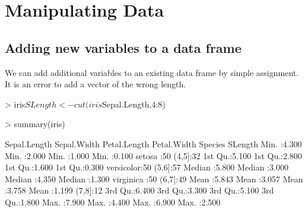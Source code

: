 %

%

\section{Manipulating Data}
\label{sec:manipulatingData}%

\subsection{Adding new variables to a data frame}

We can add additional variables to an existing data frame by simple assignment.
It is an error to add a vector of the wrong length.

\begin{Schunk}
\begin{Sinput}
> iris$SLength <- cut(iris$Sepal.Length,4:8)
\end{Sinput}
\end{Schunk}

\begin{Schunk}
\begin{Sinput}
> summary(iris)
\end{Sinput}
\begin{Soutput}
  Sepal.Length    Sepal.Width     Petal.Length    Petal.Width          Species    SLength  
 Min.   :4.300   Min.   :2.000   Min.   :1.000   Min.   :0.100   setosa    :50   (4,5]:32  
 1st Qu.:5.100   1st Qu.:2.800   1st Qu.:1.600   1st Qu.:0.300   versicolor:50   (5,6]:57  
 Median :5.800   Median :3.000   Median :4.350   Median :1.300   virginica :50   (6,7]:49  
 Mean   :5.843   Mean   :3.057   Mean   :3.758   Mean   :1.199                   (7,8]:12  
 3rd Qu.:6.400   3rd Qu.:3.300   3rd Qu.:5.100   3rd Qu.:1.800                             
 Max.   :7.900   Max.   :4.400   Max.   :6.900   Max.   :2.500                             
\end{Soutput}
\end{Schunk}


